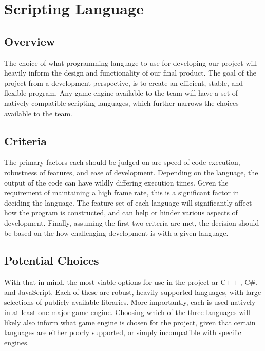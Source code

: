 \documentclass[onecolumn, draftclsnofoot,10pt, compsoc]{IEEEtran}
\begin{document}

{}

\section{Scripting Language}

\subsection{Overview}
The choice of what programming language to use for developing our project will heavily inform the design and functionality of our final product. The goal of the project from a development perspective, is to create an efficient, stable, and flexible program. Any game engine available to the team will have a set of natively compatible scripting languages, which further narrows the choices available to the team.

\subsection{Criteria}
The primary factors each should be judged on are speed of code execution, robustness of features, and ease of development. Depending on the language, the output of the code can have wildly differing execution times. Given the requirement of maintaining a high frame rate, this is a significant factor in deciding the language. The feature set of each language will significantly affect how the program is constructed, and can help or hinder various aspects of development. Finally, assuming the first two criteria are met, the decision should be based on the how challenging development is with a given language.

\subsection{Potential Choices}
With that in mind, the most viable options for use in the project ar C$++$, C\#, and JavaScript. Each of these are robust, heavily supported languages, with large selections of publicly available libraries. More importantly, each is used natively in at least one major game engine. Choosing which of the three languages will likely also inform what game engine is chosen for the project, given that certain languages are either poorly supported, or simply incompatible with specific engines.
\end{document}
